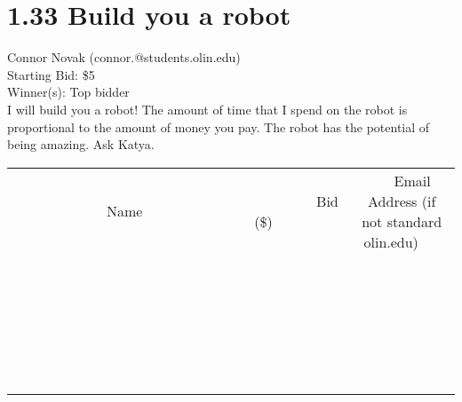 \documentclass[11pt]{article}
\begin{document}
\section*{1.33 Build you a robot}
Connor Novak (connor.@students.olin.edu) \\
Starting Bid: \$5 \\
Winner(s): 
Top bidder \\
I will build you a robot! The amount of time that I spend on the robot is proportional to the amount of money you pay. The robot has the potential of being amazing. Ask Katya. \\[6ex]
\begin{tabular}{c c c}
~~~~~~~~~~~~~Name~~~~~~~~~~~~~ & ~~~~~~~~~Bid (\$)~~~~~~~~~ & ~~~Email Address (if not standard olin.edu)~~~ \\
 & & \\
\hline
 & & \\
\hline
 & & \\
\hline
 & & \\
\hline
 & & \\
\hline
 & & \\
\hline
 & & \\
\hline
 & & \\
\hline
 & & \\
\hline
 & & \\
\hline
 & & \\
\hline
 & & \\
\hline
 & & \\
\hline
 & & \\
\hline
 & & \\
\hline
 & & \\
\hline
 & & \\
\hline
 & & \\
\hline
 & & \\
\hline
 & & \\
\hline
 & & \\
\hline
 & & \\
\hline
 & & \\
\hline
 & & \\
\hline
 & & \\
\hline
 & & \\
\hline
\end{tabular}
\clearpage
\end{document}
